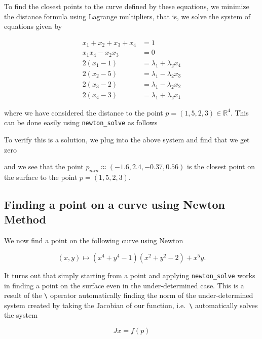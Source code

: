 \documentclass[11pt]{article}
\begin{document}
To find the closest points to the curve defined by these equations, we
minimize the distance formula using Lagrange multipliers, that is, we
solve the system of equations given by

\[
\begin{split}
x_1 + x_2 + x_3 + x_4 & = 1 \\
x_1 x_4 - x_2 x_3 & = 0 \\
2(x_1 - 1) & = \lambda_1 + \lambda_2 x_4 \\
2(x_2 - 5) & = \lambda_1 - \lambda_2 x_3 \\
2(x_3 - 2) & = \lambda_1 - \lambda_2 x_2 \\
2(x_4 - 3) & = \lambda_1 + \lambda_2 x_1
\end{split}
\]

where we have considered the distance to the point \(p = (1, 5, 2, 3) \in \mathbb{R}^4\). This
can be done easily using \texttt{newton\_solve} as follows


        
    To verify this is a solution, we plug into the above system and find
that we get zero



and we see that the point $p_{min} \approx (-1.6, 2.4, -0.37, 0.56)$ is the closest point on the surface to the point $p = (1,5,2,3)$. 

\break
        
    \hypertarget{finding-a-point-on-a-curve-using-newton-method}{%
\subsection{Finding a point on a curve using Newton
Method}\label{finding-a-point-on-a-curve-using-newton-method}}

We now find a point on the following curve using Newton

\[
(x, y) \mapsto (x^4 + y^4 - 1)(x^2 + y^2 - 2) + x^5y. 
\]

It turns out that simply starting from a point and applying
\texttt{newton\_solve} works in finding a point on the surface even in
the under-determined case. This is a result of the
\texttt{\textbackslash{}} operator automatically finding the norm of the
under-determined system created by taking the Jacobian of our function,
i.e.~\texttt{\textbackslash{}} automatically solves the system

\begin{equation}
Jx = f(p)
\end{equation}
\end{document}
